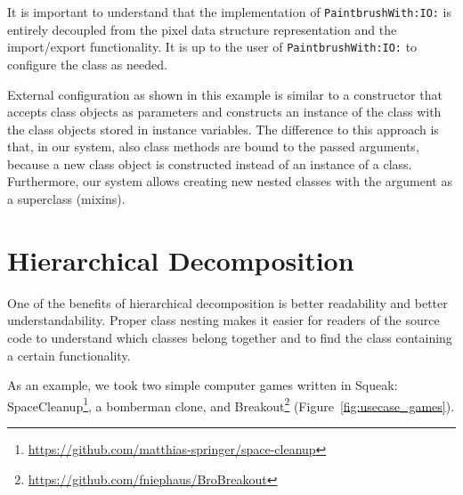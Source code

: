 It is important to understand that the implementation of \texttt{PaintbrushWith:IO:} is entirely decoupled from the pixel data structure representation and the import/export functionality. It is up to the user of \texttt{PaintbrushWith:IO:} to configure the class as needed.

External configuration as shown in this example is similar to a constructor that accepts class objects as parameters and constructs an instance of the class with the class objects stored in instance variables. The difference to this approach is that, in our system, also class methods are bound to the passed arguments, because a new class object is constructed instead of an instance of a class. Furthermore, our system allows creating new nested classes with the argument as a superclass (mixins).

\section{Hierarchical Decomposition}
\label{sec:usecase_hierach_decomp}
One of the benefits of hierarchical decomposition is better readability and better understandability. Proper class nesting makes it easier for readers of the source code to understand which classes belong together and to find the class containing a certain functionality.

As an example, we took two simple computer games written in Squeak: SpaceCleanup\footnote{\url{https://github.com/matthias-springer/space-cleanup}}, a bomberman clone, and Breakout\footnote{\url{https://github.com/fniephaus/BroBreakout}} (Figure~\ref{fig:usecase_games}).

